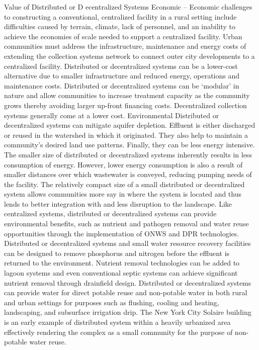 Value of
Distributed or D ecentralized
Systems
Economic – Economic challenges to constructing a conventional, centralized facility in a rural setting include difficulties caused by terrain, climate, lack of personnel, and an inability to achieve the economies of scale needed to support a centralized facility. Urban communities must address the infrastructure, maintenance and energy costs of extending the collection systems network to connect outer city developments to a centralized facility. Distributed or decentralized systems can be a lower-cost alternative due to smaller infrastructure and reduced energy, operations and maintenance costs. Distributed or decentralized systems can be ‘modular’ in nature and allow communities to increase treatment capacity as the community grows thereby avoiding larger up-front financing costs. Decentralized collection systems generally come at a lower cost.
Environmental
Distributed or decentralized systems can mitigate aquifer depletion. Effluent is either discharged or reused in the watershed in which it originated. They also help to maintain a community’s desired land use patterns. Finally, they can be less energy intensive. The smaller size of distributed or decentralized systems inherently results in less consumption of energy. However, lower energy consumption is also a result of smaller distances over which wastewater is conveyed, reducing pumping needs of the facility.
The relatively compact size of a small distributed or decentralized system allows communities more say in where the system is located and thus lends to better integration with and less disruption to the landscape.
Like centralized systems, distributed or decentralized systems can provide environmental benefits, such as nutrient and pathogen removal and water reuse opportunities through the implementation of ONWS and DPR technologies. Distributed or decentralized systems and small water resource recovery facilities can be designed to remove phosphorus and nitrogen before the effluent is returned to the environment. Nutrient removal technologies can be added to lagoon systems and even conventional septic systems can achieve significant nutrient removal through drainfield design. Distributed or decentralized systems can provide water for direct potable reuse and non-potable water in both rural and urban settings for purposes such as flushing, cooling and heating, landscaping, and subsurface irrigation drip. The New York City Solaire building is an early example of distributed system within a heavily urbanized area effectively rendering the complex as a small community for the purpose of non-potable water reuse.
